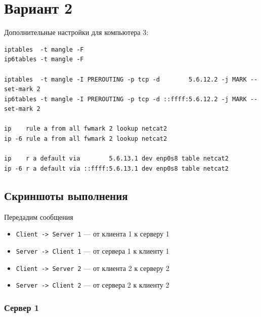 
\newpage

\section{Вариант 2}

Дополнительные настройки для компьютера 3:

\begin{verbatim}
iptables  -t mangle -F
ip6tables -t mangle -F

iptables  -t mangle -I PREROUTING -p tcp -d        5.6.12.2 -j MARK --set-mark 2
ip6tables -t mangle -I PREROUTING -p tcp -d ::ffff:5.6.12.2 -j MARK --set-mark 2

ip    rule a from all fwmark 2 lookup netcat2
ip -6 rule a from all fwmark 2 lookup netcat2

ip    r a default via        5.6.13.1 dev enp0s8 table netcat2
ip -6 r a default via ::ffff:5.6.13.1 dev enp0s8 table netcat2
\end{verbatim}

\subsection{Скриншоты выполнения}

Передадим сообщения
\begin{itemize}
    \item \texttt{Client -> Server 1} --- от клиента 1 к серверу 1
    \item \texttt{Server -> Client 1} --- от сервера 1 к клиенту 1
    \item \texttt{Client -> Server 2} --- от клиента 2 к серверу 2
    \item \texttt{Server -> Client 2} --- от сервера 2 к клиенту 2
\end{itemize}

\subsubsection{Сервер 1}
